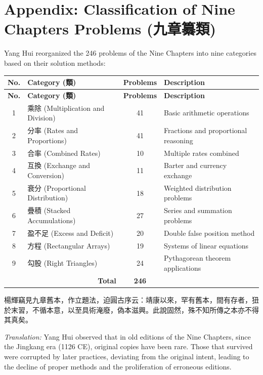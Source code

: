 \documentclass[11pt,a4paper]{article}
\newcommand{\zh}[1]{{#1}}
\newenvironment{chpassage}{%
  \par\medskip
  \begin{center}
  \begin{minipage}{0.95\textwidth}
  \setlength{\parindent}{2em}
  \linespread{1.3}\selectfont
}{%
  \end{minipage}
  \end{center}
  \medskip
}
\begin{document}
\section*{Appendix: Classification of Nine Chapters Problems (\zh{九章纂類})}

Yang Hui reorganized the 246 problems of the Nine Chapters into nine
categories based on their solution methods:

\begin{center}
\begin{longtable}{|c|l|c|p{8cm}|}
\hline
\textbf{No.} & \textbf{Category (\zh{類})} & \textbf{Problems} & \textbf{Description} \\
\hline
\endfirsthead
\hline
\textbf{No.} & \textbf{Category (\zh{類})} & \textbf{Problems} & \textbf{Description} \\
\hline
\endhead
1 & \zh{乘除} (Multiplication and Division) & 41 & Basic arithmetic operations \\
2 & \zh{分率} (Rates and Proportions) & 41 & Fractions and proportional reasoning \\
3 & \zh{合率} (Combined Rates) & 10 & Multiple rates combined \\
4 & \zh{互換} (Exchange and Conversion) & 11 & Barter and currency exchange \\
5 & \zh{衰分} (Proportional Distribution) & 18 & Weighted distribution problems \\
6 & \zh{疊積} (Stacked Accumulations) & 27 & Series and summation problems \\
7 & \zh{盈不足} (Excess and Deficit) & 20 & Double false position method \\
8 & \zh{方程} (Rectangular Arrays) & 19 & Systems of linear equations \\
9 & \zh{勾股} (Right Triangles) & 24 & Pythagorean theorem applications \\
\hline
\multicolumn{2}{|r|}{\textbf{Total}} & \textbf{246} & \\
\hline
\end{longtable}
\end{center}

\begin{chpassage}
\zh{楊輝竊見九章舊本，作立題法，迫圓古序云：靖康以來，罕有舊本，間有存者，狃於末習，不循本意，以至具術淹廢，偽本滋興。此說固然，殊不知所傳之本亦不得其真矣。}

\medskip
\textit{Translation:} Yang Hui observed that in old editions of the Nine
Chapters, since the Jingkang era (1126 CE), original copies have been rare.
Those that survived were corrupted by later practices, deviating from the
original intent, leading to the decline of proper methods and the
proliferation of erroneous editions.
\end{chpassage}
\end{document}
